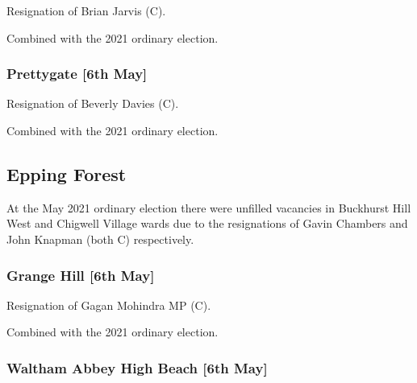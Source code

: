 \documentclass[a4paper,openany]{book}
\begin{document}
\begin{resultsiii}

Resignation of Brian Jarvis (C).

Combined with the 2021 ordinary election.

\subsubsection*{Prettygate \hspace*{\fill}\nolinebreak[1]%
	\enspace\hspace*{\fill}
	[6th May]}


Resignation of Beverly Davies (C).

Combined with the 2021 ordinary election.

\subsection*{Epping Forest}

At the May 2021 ordinary election there were unfilled vacancies in Buckhurst Hill West and Chigwell Village wards due to the resignations of Gavin Chambers and John Knapman (both C) respectively.

\subsubsection*{Grange Hill \hspace*{\fill}\nolinebreak[1]%
	\enspace\hspace*{\fill}
	[6th May]}


Resignation of Gagan Mohindra MP (C).

Combined with the 2021 ordinary election.

\subsubsection*{Waltham Abbey High Beach \hspace*{\fill}\nolinebreak[1]%
	\enspace\hspace*{\fill}
	[6th May]}


\end{resultsiii}
\end{document}
